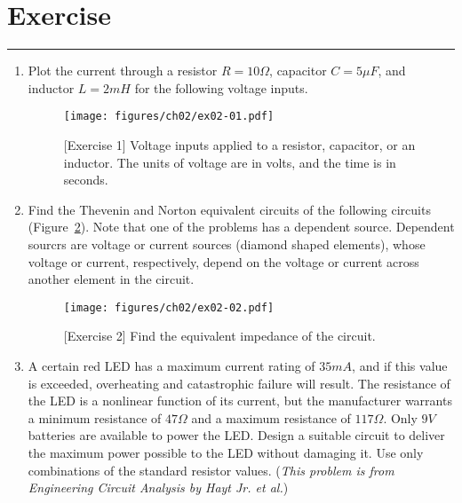 \section{Exercise}
\vspace{-0.5cm}
\begin{center}
    \rule{\textwidth}{1pt}
\end{center}

\begin{enumerate}
    \item Plot the current through a resistor $R = 10\Omega$, capacitor $C = 5\mu F$, and inductor $L = 2mH$ for the following voltage inputs.
    \begin{figure}[h]
        \centering
        \texttt{[image: figures/ch02/ex02-01.pdf]}
        \caption{[Exercise 1] Voltage inputs applied to a resistor, capacitor, or an inductor. The units of voltage are in volts, and the time is in seconds.}
        \label{fig:ex02-01}
    \end{figure}
    
    \item Find the Thevenin and Norton equivalent circuits of the following circuits (Figure~\ref{fig:ex02-02}). Note that one of the problems has a dependent source. Dependent sourcrs are voltage or current sources (diamond shaped elements), whose voltage or current, respectively, depend on the voltage or current across another element in the circuit.
    \begin{figure}[h]
        \centering
        \texttt{[image: figures/ch02/ex02-02.pdf]}
        \caption{[Exercise 2] Find the equivalent impedance of the circuit.}
        \label{fig:ex02-02}
    \end{figure}
    
    \item A certain red LED has a maximum current rating of $35 mA$, and if this value is exceeded, overheating and catastrophic failure will result. The resistance of the LED is a nonlinear function of its current, but the manufacturer warrants a minimum resistance of $47 \Omega$ and a maximum resistance of $117 \Omega$. Only $9 V$ batteries are available to power the LED. Design a suitable circuit to deliver the maximum power possible to the LED without damaging it. Use only combinations of the standard resistor values. (\textit{This problem is from Engineering Circuit Analysis by Hayt Jr. et al.})
    

\end{enumerate}
